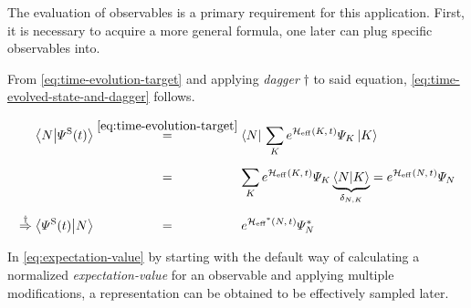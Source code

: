 The evaluation of observables is a primary requirement for this application. 
First, it is necessary to acquire a more general formula, one later can plug specific observables into.

From \autoref{eq:time-evolution-target} and applying \emph{dagger} $\dagger$ to said equation, \autoref{eq:time-evolved-state-and-dagger} follows.


\begin{equation}
    \label{eq:time-evolved-state-and-dagger}
    \begin{split}
        \braketHelper{N}{\psiOfT[\schroedingerPicture]} &\stackrel{\ref{eq:time-evolution-target}}{=} \braN{} \lsum[K] e^{\HeffOft[K]} \psiN[K] \ketN[K]{}\\
        & \stackrel{\phantom{\ref{eq:time-evolution-target}}}{=} 
        \lsum[K]   e^{\HeffOft[K]} \psiN[K] \underbrace{\braketHelper{N}{K}}_\text{$\delta_{N,K}$} = e^{\HeffOft} \psiN{} \\
        \stackrel{\dagger}{\Rightarrow} \braketHelper{\psiOfT[\schroedingerPicture]}{N} &\stackrel{\phantom{\ref{eq:time-evolution-target}}}{=} e^{\HeffOftStar} \psiNStar
    \end{split}
\end{equation}

In \autoref{eq:expectation-value} by starting with the default way of calculating a normalized \emph{expectation-value} for an observable \ObservableOp \cite{monteCarloObservableSampling} and applying multiple modifications, a representation can be obtained to be effectively sampled later. 

